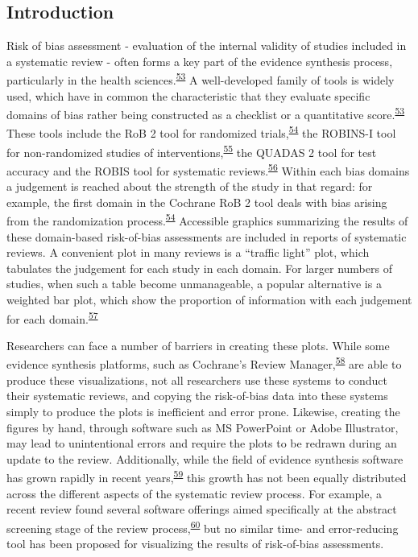 \documentclass[a4paper, twoside]{templates/ociamthesis}
\begin{document}
\hypertarget{introduction-1}{%
\subsection{Introduction}\label{introduction-1}}

Risk of bias assessment - evaluation of the internal validity of studies included in a systematic review - often forms a key part of the evidence synthesis process, particularly in the health sciences.\textsuperscript{\protect\hyperlink{ref-cochranechpt7}{53}} A well-developed family of tools is widely used, which have in common the characteristic that they evaluate specific domains of bias rather being constructed as a checklist or a quantitative score.\textsuperscript{\protect\hyperlink{ref-cochranechpt7}{53}} These tools include the RoB 2 tool for randomized trials,\textsuperscript{\protect\hyperlink{ref-sterne2019rob}{54}} the ROBINS-I tool for non-randomized studies of interventions,\textsuperscript{\protect\hyperlink{ref-sterne2016robins}{55}} the QUADAS 2 tool for test accuracy and the ROBIS tool for systematic reviews.\textsuperscript{\protect\hyperlink{ref-whiting2011quadas}{56}} Within each bias domains a judgement is reached about the strength of the study in that regard: for example, the first domain in the Cochrane RoB 2 tool deals with bias arising from the randomization process.\textsuperscript{\protect\hyperlink{ref-sterne2019rob}{54}} Accessible graphics summarizing the results of these domain-based risk-of-bias assessments are included in reports of systematic reviews. A convenient plot in many reviews is a ``traffic light'' plot, which tabulates the judgement for each study in each domain. For larger numbers of studies, when such a table become unmanageable, a popular alternative is a weighted bar plot, which show the proportion of information with each judgement for each domain.\textsuperscript{\protect\hyperlink{ref-higgins2008assessing}{57}}

Researchers can face a number of barriers in creating these plots. While some evidence synthesis platforms, such as Cochrane's Review Manager,\textsuperscript{\protect\hyperlink{ref-cochrane2014review}{58}} are able to produce these visualizations, not all researchers use these systems to conduct their systematic reviews, and copying the risk-of-bias data into these systems simply to produce the plots is inefficient and error prone. Likewise, creating the figures by hand, through software such as MS PowerPoint or Adobe Illustrator, may lead to unintentional errors and require the plots to be redrawn during an update to the review. Additionally, while the field of evidence synthesis software has grown rapidly in recent years,\textsuperscript{\protect\hyperlink{ref-marshall2015systematic}{59}} this growth has not been equally distributed across the different aspects of the systematic review process. For example, a recent review found several software offerings aimed specifically at the abstract screening stage of the review process,\textsuperscript{\protect\hyperlink{ref-harrison2020software}{60}} but no similar time- and error-reducing tool has been proposed for visualizing the results of risk-of-bias assessments.
\end{document}
